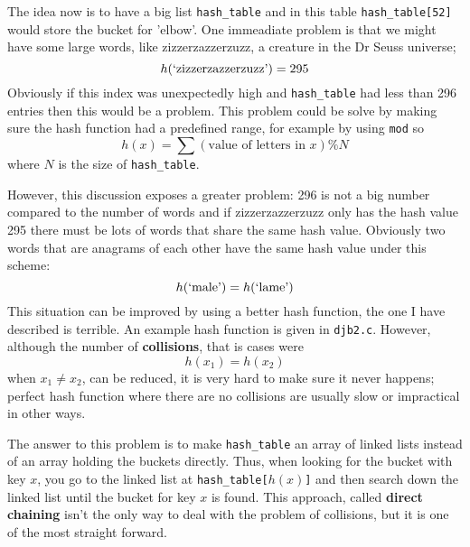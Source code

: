 \documentclass[11pt,a4paper]{scrartcl}
\begin{document}
The idea now is to have a big list \texttt{hash\_table} and in this
table \texttt{hash\_table[52]} would store the bucket for 'elbow'. One
immeadiate problem is that we might have some large words, like zizzerzazzerzuzz, a creature in the Dr Seuss universe;
\begin{equation}
h(\mbox{\lq{}zizzerzazzerzuzz\rq{}})=295
\end{equation}
Obviously if this index was unexpectedly high and \texttt{hash\_table}
had less than 296 entries then this would be a problem. This problem
could be solve by making sure the hash function had a predefined
range, for example by using \texttt{mod} so
\begin{equation}
h(x)=\sum{(\mbox{value of letters in }x)}\% N
\end{equation}
where $N$ is the size of \texttt{hash\_table}.

However, this discussion exposes a greater problem: 296 is not a big
number compared to the number of words and if zizzerzazzerzuzz only
has the hash value 295 there must be lots of words that share the same
hash value. Obviously two words that are anagrams of each other have
the same hash value under this scheme:
\begin{equation}
h(\mbox{\lq{}male\rq{}})=h(\mbox{\lq{}lame\rq{}})
\end{equation}
This situation can be improved by using a better hash function, the
one I have described is terrible. An example hash function is given in
\texttt{djb2.c}. However, although the number of \textbf{collisions},
that is cases were
\begin{equation}
h(x_1)=h(x_2)
\end{equation}
when $x_1\not=x_2$, can be reduced, it is very hard to make sure it
never happens; perfect hash function where there are no collisions
are usually slow or impractical in other ways.

The answer to this problem is to make \texttt{hash\_table} an array of
linked lists instead of an array holding the buckets directly. Thus,
when looking for the bucket with key $x$, you go to the linked list at
\texttt{hash\_table[$h(x)$]} and then search down the linked list
until the bucket for key $x$ is found. This approach, called
\textbf{direct chaining} isn't the only way to deal with the problem
of collisions, but it is one of the most straight forward.
\end{document}
